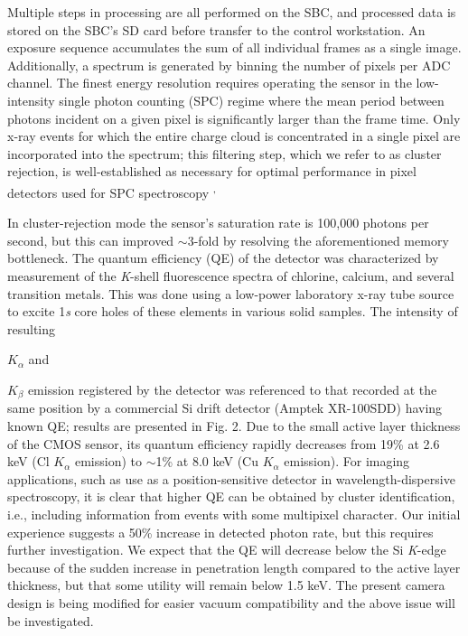 \FloatBarrier

Multiple steps in processing are all performed on the SBC, and processed
data is stored on the SBC's SD card before transfer to the control
workstation. An exposure sequence accumulates the sum of all individual
frames as a single image. Additionally, a spectrum is generated by
binning the number of pixels per ADC channel. The finest energy
resolution requires operating the sensor in the low-intensity single
photon counting (SPC) regime where the mean period between photons
incident on a given pixel is significantly larger than the frame time.
Only x-ray events for which the entire charge cloud is concentrated in a
single pixel are incorporated into the spectrum; this filtering step,
which we refer to as cluster rejection, is well-established as necessary
for optimal performance in pixel detectors used for SPC
spectroscopy \cite{SERVOLI2010CHARACTERIZATION}\textsuperscript{,}

In cluster-rejection mode the sensor's saturation rate is 100,000
photons per second, but this can improved $\sim$3-fold by
resolving the aforementioned memory bottleneck. The quantum efficiency
(QE) of the detector was characterized by measurement of the
\emph{K}-shell fluorescence spectra of chlorine, calcium, and several
transition metals. This was done using a low-power laboratory x-ray tube
source to excite 1\emph{s} core holes of these elements in various solid
samples. The intensity of resulting
\(K_{\alpha}\)
and
\(K_{\beta}\)
emission registered by the detector was referenced to that recorded at
the same position by a commercial Si drift detector (Amptek XR-100SDD)
having known QE; results are presented in Fig. 2. Due to the small
active layer thickness of the CMOS sensor, its quantum efficiency
rapidly decreases from 19\% at 2.6 keV (Cl \(K_{\alpha}\) emission) to
$\sim$1\% at 8.0 keV (Cu \(K_{\alpha}\) emission). For
imaging applications, such as use as a position-sensitive detector in
wavelength-dispersive spectroscopy, it is clear that higher QE can be
obtained by cluster identification, i.e., including information from
events with some multipixel character. Our initial experience suggests a
50\% increase in detected photon rate, but this requires further
investigation. We expect that the QE will decrease below the Si
\emph{K}-edge because of the sudden increase in penetration length
compared to the active layer thickness, but that some utility will
remain below 1.5 keV. The present camera design is being modified for
easier vacuum compatibility and the above issue will be investigated.


